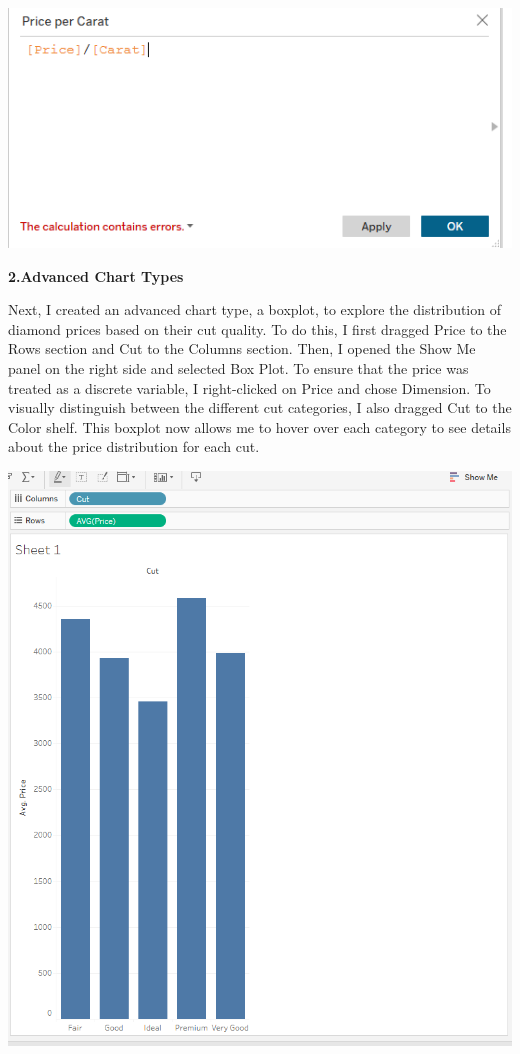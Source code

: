 \documentclass[
  letterpaper,
  DIV=11,
  numbers=noendperiod]{scrreprt}
\begin{document}
\includegraphics{Calculated field _ Price_Per_Carat _ Olufawo.png}

\textbf{2.Advanced Chart Types}

Next, I created an advanced chart type, a boxplot, to explore the
distribution of diamond prices based on their cut quality. To do this, I
first dragged Price to the Rows section and Cut to the Columns section.
Then, I opened the Show Me panel on the right side and selected Box
Plot. To ensure that the price was treated as a discrete variable, I
right-clicked on Price and chose Dimension. To visually distinguish
between the different cut categories, I also dragged Cut to the Color
shelf. This boxplot now allows me to hover over each category to see
details about the price distribution for each cut.

\includegraphics{Measure_ BarPlot_ Price_per_Cut_Olufawo.png}
\end{document}
